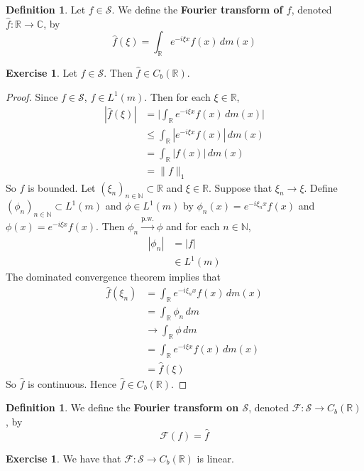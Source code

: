 \documentclass[12pt]{amsart}
\theoremstyle{definition}
\newtheorem{defn}[definition]{Definition}
\newtheorem{ex}[definition]{Exercise}
\newcommand{\C}{\mathbb{C}}
\newcommand{\N}{\mathbb{N}}
\newcommand{\R}{\mathbb{R}}
\newcommand{\MF}{\mathcal{F}}
\newcommand{\MS}{\mathcal{S}}
\newcommand{\dm}{\, d m}
\newcommand{\convt}[1]{\xrightarrow{\text{#1}}}
\begin{document}
	\begin{defn}
		Let $f \in \MS$. We define the \textbf{Fourier transform of $f$}, denoted $\hat{f} : \R \rightarrow \C$, by $$ \hat{f}(\xi) = \int_{\R} e^{-i \xi x}f(x) \, dm(x)$$ 
	\end{defn}

	\begin{ex}
		Let $f \in \MS$. Then $\hat{f} \in C_b(\R)$.
	\end{ex}

	\begin{proof}
		Since $f \in \MS$, $f \in L^1(m)$. Then for each $\xi \in \R$,
		\begin{align*}
			|\hat{f}(\xi)| 
			& = \bigg| \int_{\R} e^{-i\xi x}f(x) \dm(x) \bigg| \\
			& \leq \int_{\R} |e^{-i\xi x}f(x)| \dm(x) \\
			& = \int_{\R} |f(x)| \dm(x) \\
			& = \|f\|_1
		\end{align*}
		So $f$ is bounded. Let $(\xi_n)_{n \in \N} \subset \R$ and $\xi \in \R$. Suppose that $\xi_n \rightarrow \xi$. Define $(\phi_n)_{n \in \N} \subset L^1(m)$ and $\phi \in L^1(m)$ by $\phi_n(x) = e^{-i\xi_n x}f(x)$ and $\phi(x) = e^{-i\xi x}f(x)$. Then $\phi_n \convt{p.w.} \phi$ and for each $n \in \N$, 
		\begin{align*}
			|\phi_n|
			& = |f| \\
			& \in L^1(m)
		\end{align*}
		The dominated convergence theorem implies that 
		\begin{align*}
			\hat{f}(\xi_n)
			& = \int_{\R} e^{-i\xi_n x}f(x) \dm(x) \\
			& = \int_{\R} \phi_n \dm \\
			& \rightarrow \int_{\R} \phi \dm \\
			& = \int_{\R} e^{-i\xi x}f(x) \dm(x) \\
			& = \hat{f}(\xi)
		\end{align*}
		So $\hat{f}$ is continuous. Hence $\hat{f} \in C_b(\R)$.
	\end{proof}

	\begin{defn}
		We define the \textbf{Fourier transform on $\MS$}, denoted $\MF: \MS \rightarrow C_b(\R)$, by 
		$$\MF(f) = \hat{f}$$
	\end{defn}
	
	\begin{ex}
		We have that $\MF: \MS \rightarrow C_b(\R)$ is linear. 
	\end{ex}
	
\end{document}
